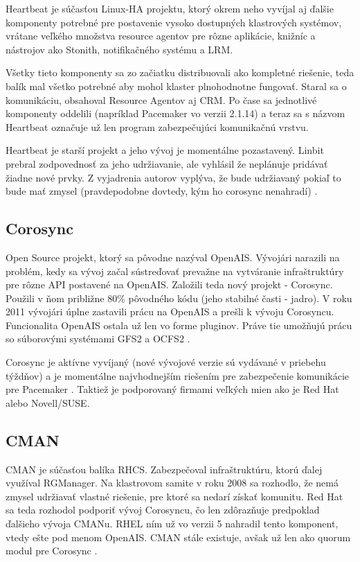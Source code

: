 Heartbeat je súčasťou Linux-HA projektu, ktorý okrem neho vyvíjal aj ďalšie komponenty potrebné pre postavenie vysoko dostupných klastrových systémov, vrátane veľkého množstva resource agentov pre rôzne aplikácie, knižníc a nástrojov ako Stonith, notifikačného systému a \ac{LRM}.

Všetky tieto komponenty sa zo začiatku distribuovali ako kompletné riešenie, teda balík mal všetko potrebné aby mohol klaster plnohodnotne fungovať. Staral sa o komunikáciu, obsahoval Resource Agentov aj \ac{CRM}. Po čase sa jednotlivé komponenty oddelili (napríklad Pacemaker vo verzii 2.1.14) a teraz sa s názvom Heartbeat označuje už len program zabezpečujúci komunikačnú vrstvu.

Heartbeat je starší projekt a jeho vývoj je momentálne pozastavený. Linbit prebral zodpovednosť za jeho udržiavanie, ale vyhlásil že neplánuje pridávať žiadne nové prvky. Z vyjadrenia autorov vyplýva, že bude udržiavaný pokiaľ to bude mať zmysel (pravdepodobne dovtedy, kým ho corosync nenahradí) \cite{web:linux-ha.org}.

\subsection{Corosync}
Open Source projekt, ktorý sa pôvodne nazýval OpenAIS. Vývojári narazili na problém, kedy sa vývoj začal sústreďovať prevažne na vytváranie infraštruktúry pre rôzne API postavené na OpenAIS. Založili teda nový projekt - Corosync. Použili v ňom približne 80\% pôvodného kódu (jeho stabilné časti - jadro). V roku 2011 vývojári úplne zastavili prácu na OpenAIS a prešli k vývoju Corosyncu. Funcionalita OpenAIS ostala už len vo forme pluginov. Práve tie umožňujú prácu so súborovými systémami GFS2 a OCFS2 \cite{web:openais.org}.

Corosync je aktívne vyvíjaný (nové vývojové verzie sú vydávané v priebehu týždňov) a je momentálne najvhodnejším riešením pre zabezpečenie komunikácie pre Pacemaker \cite{web:ClusterLabs}. Taktiež je podporovaný firmami veľkých mien ako je Red Hat alebo Novell/SUSE.

\subsection{CMAN}
CMAN je súčasťou balíka RHCS. Zabezpečoval infraštruktúru, ktorú ďalej využíval RGManager. Na klastrovom samite v roku 2008 sa rozhodlo, že nemá zmysel udržiavať vlastné riešenie, pre ktoré sa nedarí získať komunitu. Red Hat sa teda rozhodol podporiť vývoj Corosyncu, čo len zdôrazňuje predpoklad ďalšieho vývoja CMANu. \ac{RHEL} ním už vo verzii 5 nahradil tento komponent, vtedy ešte pod menom OpenAIS. CMAN stále existuje, avšak už len ako quorum modul pre Corosync \cite{pdf:cman}.

